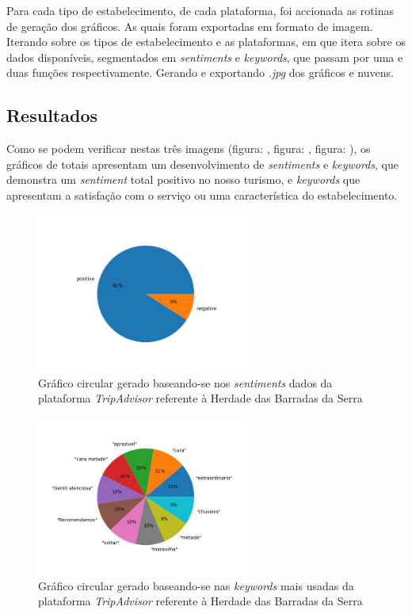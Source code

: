 Para cada tipo de estabelecimento, de cada plataforma, foi accionada as rotinas de geração dos gráficos. As quais foram exportadas em formato de imagem. Iterando sobre os tipos de estabelecimento e as plataformas, em que itera sobre os dados disponíveis, segmentados em \textit{sentiments} e \textit{keywords}, que passam por uma e duas funções respectivamente. Gerando e exportando \textit{.jpg} dos gráficos e nuvens.

\subsection{Resultados}

Como se podem verificar nestas três imagens (figura: \cite{fig:exemplofig21sentimentsTrip},  figura: \cite{fig:exemplofig21keywordsTrip}, figura: \cite{fig:exemplofig21cloudTrip}), os gráficos de totais apresentam um desenvolvimento de \textit{sentiments} e \textit{keywords}, que demonstra um \textit{sentiment} total positivo no nosso turismo, e \textit{keywords} que apresentam a satisfação com o serviço ou uma característica do estabelecimento.

\begin{figure}[!htb]
\centering
\includegraphics[width=7cm]{figuras/TripAdvisor/Hotels/hotel21_sentiments.jpeg}
\caption{Gráfico circular gerado baseando-se nos \textit{sentiments} dados da plataforma \textit{TripAdvisor} referente à Herdade das Barradas da Serra}
\label{fig:exemplofig21sentimentsTrip}
\end{figure}

\begin{figure}[!htb]
\centering
\includegraphics[width=7cm]{figuras/TripAdvisor/Hotels/hotel21_keywords.jpeg}
\caption{Gráfico circular gerado baseando-se nas \textit{keywords} mais usadas da plataforma \textit{TripAdvisor} referente à Herdade das Barradas da Serra}
\label{fig:exemplofig21keywordsTrip}
\end{figure}

